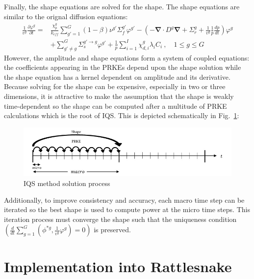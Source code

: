 \documentclass[12pt]{article}
\newcommand{\bs}[1]{\mathbf{#1}}
\renewcommand{\div}{\bs{\nabla}\! \cdot \!}
\newcommand{\grad}{\bs{\nabla}}
\newcommand{\fig}[1]{Fig.~\ref{#1}}                      %
\newcommand{\keff}{k_\textit{eff}}
\begin{document}
Finally, the shape equations are solved for the shape. The shape equations are similar to the orignal diffusion equations:
\begin{align}
\frac{1}{v^g} \frac{\partial \varphi^g }{\partial t} =& \frac{\chi_p^g}{\keff} \sum_{g'=1}^G (1-\beta) \nu^{g'} \Sigma_f^{g'} \varphi^{g'} -  \left( -\div D^g \grad  + \Sigma_r^g + \frac{1}{v^g}\frac{1}{p}\frac{dp}{dt}\right) \varphi^g  \nonumber \\
&  + \sum_{g'\neq g}^G\Sigma_s^{g'\to g} \varphi^{g'}  + \frac{1}{p}\sum_{i=1}^I\chi_{d,i}^g\lambda_i C_i \ , \quad 1 \le g \le G 
\label{eq:shape}
\end{align}
However, the amplitude and shape equations form a system of coupled equations: the coefficients appearing in the PRKEs depend upon the shape solution while the shape equation has a kernel dependent on amplitude and its derivative.  Because solving for the shape can be expensive, especially in two or three dimensions, it is attractive to make the assumption that the shape is weakly time-dependent so the shape can be computed after a multitude of PRKE calculations which is the root of IQS.  This is depicted schematically in \fig{fig:IQS}:
%
\begin{figure}[h]
\includegraphics[width=\linewidth]{figures/IQS_visualization.jpg}
\caption{IQS method solution process}
\label{fig:IQS}
\end{figure}
%
Additionally, to improve consistency and accuracy, each macro time step can be iterated so the best shape is used to compute power at the micro time steps.  This iteration process must converge the shape such that the uniqueness condition $(\frac{d}{dt}\sum_{g=1}^G\left(\phi^{*g},\frac{1}{v^g}\varphi^g\right)=0)$ is preserved.


%
\section{Implementation into Rattlesnake}
\label{sect::implementation}
\end{document}
